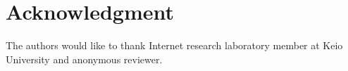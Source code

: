 \documentclass[10pt,final,journal,a4paper]{IEEEtran}
\begin{document}
\section*{Acknowledgment}
The authors would like to thank Internet research laboratory member at Keio University and anonymous reviewer.







%
%
%



\end{document}
